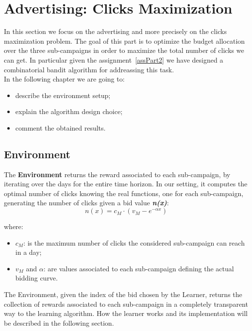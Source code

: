 \chapter{Advertising: Clicks Maximization}

In this section we focus on the advertising and more precisely on the clicks maximization problem.
The goal of this part is to optimize the budget allocation over the three sub-campaigns in order to maximize the total number of clicks we can get.
In particular given the assignment~\ref{assPart2} we have designed a combinatorial bandit algorithm for addreassing this task.\\
In the following chapter we are going to:
\begin{itemize}
	\item describe the environment setup;
	\item explain the algorithm design choice;
	\item comment the obtained results.
\end{itemize}

\section{Environment}
The \textbf{Environment} returns the reward associated to each sub-campaign, by iterating over the days for the entire time horizon.
In our setting, it computes the optimal number of clicks knowing the real functions, one for each sub-campaign, generating  the number of clicks given a bid value \textbf{\textit{n(x)}}:\\

\begin{equation}
	n(x) = c_{M} \cdot (v_{M} - e^{-\alpha x})
\end{equation}

where:
\begin{itemize}
	\item $c_{M}$: is the maximum number of clicks the considered sub-campaign can reach in a day;
	\item $v_{M}$ and $\alpha$: are values associated to each sub-campaign defining the actual bidding curve.
\end{itemize}


The Environment, given the index of the bid chosen by the Learner, returns the collection of rewards associated to each sub-campaign in a completely transparent way to the learning algorithm.
How the learner works and its implementation will be described in the following section.



